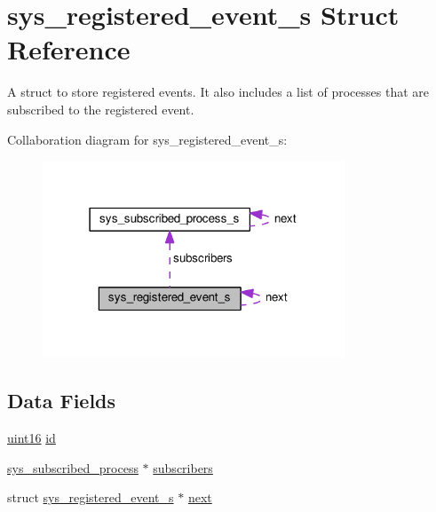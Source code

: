 \hypertarget{structsys__registered__event__s}{}\section{sys\+\_\+registered\+\_\+event\+\_\+s Struct Reference}
\label{structsys__registered__event__s}


A struct to store registered events. It also includes a list of processes that are subscribed to the registered event.  




Collaboration diagram for sys\+\_\+registered\+\_\+event\+\_\+s\+:\nopagebreak
\begin{figure}[H]
\begin{center}
\leavevmode
\includegraphics[width=255pt]{de/d55/structsys__registered__event__s__coll__graph}
\end{center}
\end{figure}
\subsection*{Data Fields}
\begin{DoxyCompactItemize}
\item 
\hyperlink{definitions_8h_a05f6b0ae8f6a6e135b0e290c25fe0e4e}{uint16} \hyperlink{structsys__registered__event__s_a44886c67a44aee553cbbbcd9903fcd39}{id}
\item 
\hyperlink{events_8c_a855a9b5c8c07fedd9f2a8bbf5ee9b4f0}{sys\+\_\+subscribed\+\_\+process} $\ast$ \hyperlink{structsys__registered__event__s_acea93fade98b2e5bd81cc9b6ed35388d}{subscribers}
\item 
struct \hyperlink{structsys__registered__event__s}{sys\+\_\+registered\+\_\+event\+\_\+s} $\ast$ \hyperlink{structsys__registered__event__s_a084bfc795b0f5135b6439a28bf9920c1}{next}
\end{DoxyCompactItemize}


